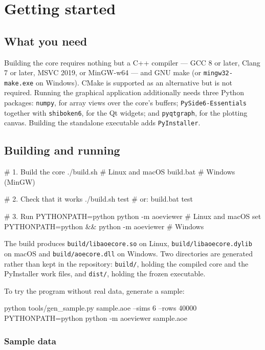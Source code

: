 \documentclass[11pt,a4paper,oneside]{report}
\newcommand{\code}[1]{\texttt{#1}}
\begin{document}
\chapter{Getting started}

\section{What you need}

Building the core requires nothing but a C++ compiler --- GCC 8 or later, Clang
7 or later, MSVC 2019, or MinGW-w64 --- and GNU make (or
\code{mingw32-make.exe} on Windows). CMake is supported as an alternative but
is not required. Running the graphical application additionally needs three
Python packages: \code{numpy}, for array views over the core's buffers;
\code{PySide6-Essentials} together with \code{shiboken6}, for the Qt widgets;
and \code{pyqtgraph}, for the plotting canvas. Building the standalone
executable adds \code{PyInstaller}.

\section{Building and running}

\begin{aoecode}
# 1. Build the core
./build.sh                  # Linux and macOS
build.bat                   # Windows (MinGW)

# 2. Check that it works
./build.sh test             # or: build.bat test

# 3. Run
PYTHONPATH=python python -m aoeviewer                # Linux and macOS
set PYTHONPATH=python && python -m aoeviewer         # Windows
\end{aoecode}

The build produces \code{build/libaoecore.so} on Linux,
\code{build/libaoecore.dylib} on macOS and \code{build/aoecore.dll} on
Windows. Two directories are generated rather than kept in the repository:
\code{build/}, holding the compiled core and the PyInstaller work files, and
\code{dist/}, holding the frozen executable.

To try the program without real data, generate a sample:

\begin{aoecode}
python tools/gen_sample.py sample.aoe --sims 6 --rows 40000
PYTHONPATH=python python -m aoeviewer sample.aoe
\end{aoecode}

\subsection{Sample data}
\label{sec:samples}
\end{document}
